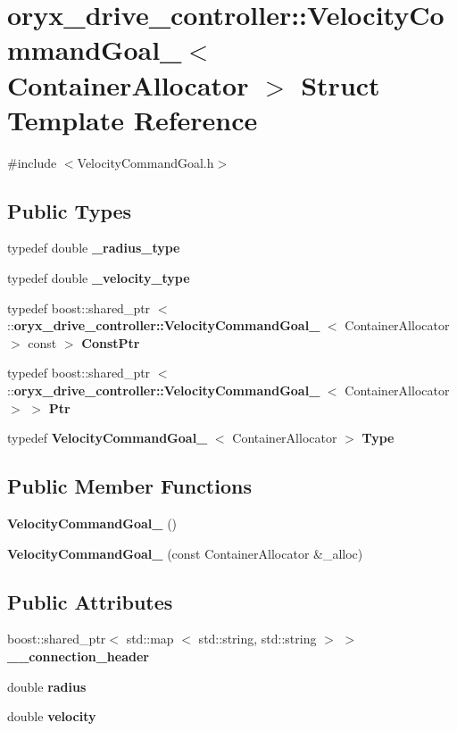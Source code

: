 \section{oryx\-\_\-drive\-\_\-controller\-:\-:\-Velocity\-Command\-Goal\-\_\-$<$ \-Container\-Allocator $>$ \-Struct \-Template \-Reference}
\label{structoryx__drive__controller_1_1VelocityCommandGoal__}


{\ttfamily \#include $<$\-Velocity\-Command\-Goal.\-h$>$}

\subsection*{\-Public \-Types}
\begin{DoxyCompactItemize}
\item 
typedef double {\bf \-\_\-radius\-\_\-type}
\item 
typedef double {\bf \-\_\-velocity\-\_\-type}
\item 
typedef boost\-::shared\-\_\-ptr\*
$<$ \-::{\bf oryx\-\_\-drive\-\_\-controller\-::\-Velocity\-Command\-Goal\-\_\-}\*
$<$ \-Container\-Allocator $>$ const  $>$ {\bf \-Const\-Ptr}
\item 
typedef boost\-::shared\-\_\-ptr\*
$<$ \-::{\bf oryx\-\_\-drive\-\_\-controller\-::\-Velocity\-Command\-Goal\-\_\-}\*
$<$ \-Container\-Allocator $>$ $>$ {\bf \-Ptr}
\item 
typedef {\bf \-Velocity\-Command\-Goal\-\_\-}\*
$<$ \-Container\-Allocator $>$ {\bf \-Type}
\end{DoxyCompactItemize}
\subsection*{\-Public \-Member \-Functions}
\begin{DoxyCompactItemize}
\item 
{\bf \-Velocity\-Command\-Goal\-\_\-} ()
\item 
{\bf \-Velocity\-Command\-Goal\-\_\-} (const \-Container\-Allocator \&\-\_\-alloc)
\end{DoxyCompactItemize}
\subsection*{\-Public \-Attributes}
\begin{DoxyCompactItemize}
\item 
boost\-::shared\-\_\-ptr$<$ std\-::map\*
$<$ std\-::string, std\-::string $>$ $>$ {\bf \-\_\-\-\_\-connection\-\_\-header}
\item 
double {\bf radius}
\item 
double {\bf velocity}
\end{DoxyCompactItemize}


